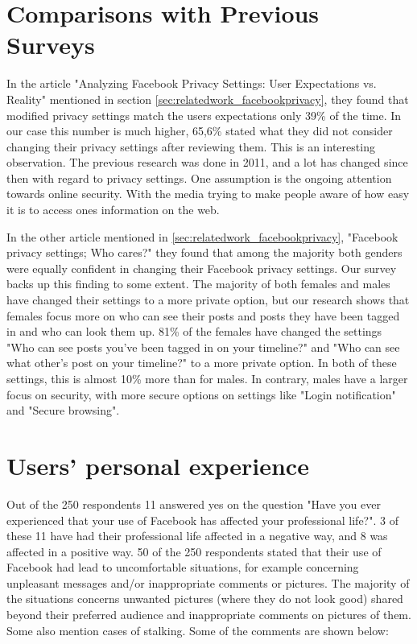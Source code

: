 \section{Comparisons with Previous Surveys} 
In the article "Analyzing Facebook Privacy Settings: User Expectations vs. Reality" mentioned in section \ref{sec:relatedwork_facebookprivacy}, they found that modified privacy settings match the users expectations only 39\% of the time. In our case this number is much higher, 65,6\% stated what they did not consider changing their privacy settings after reviewing them. This is an interesting observation. The previous research was done in 2011, and a lot has changed since then with regard to privacy settings. One assumption is the ongoing attention towards online security. With the media trying to make people aware of how easy it is to access ones information on the web. 

In the other article mentioned in \ref{sec:relatedwork_facebookprivacy}, "Facebook privacy settings; Who cares?" they found that among the majority both genders were equally confident in changing their Facebook privacy settings. Our survey backs up this finding to some extent. The majority of both females and males have changed their settings to a more private option, but our research shows that females focus more on who can see their posts and posts they have been tagged in and who can look them up. 81\% of the females have changed the settings "Who can see posts you've been tagged in on your timeline?" and "Who can see what other's post on your timeline?" to a more private option. In both of these settings, this is almost 10\% more than for males. In contrary, males have a larger focus on security, with more secure options on settings like "Login notification" and "Secure browsing". 

\section{Users' personal experience}
Out of the 250 respondents 11 answered yes on the question "Have you ever experienced that your use of Facebook has affected your professional life?". 3 of these 11 have had their professional life affected in a negative way, and 8 was affected in a positive way. 
50 of the 250 respondents stated that their use of Facebook had lead to uncomfortable situations, for example concerning unpleasant messages and/or inappropriate comments or pictures. The majority of the situations concerns unwanted pictures (where they do not look good) shared beyond their preferred audience and inappropriate comments on pictures of them. Some also mention cases of stalking. Some of the comments are shown below:

